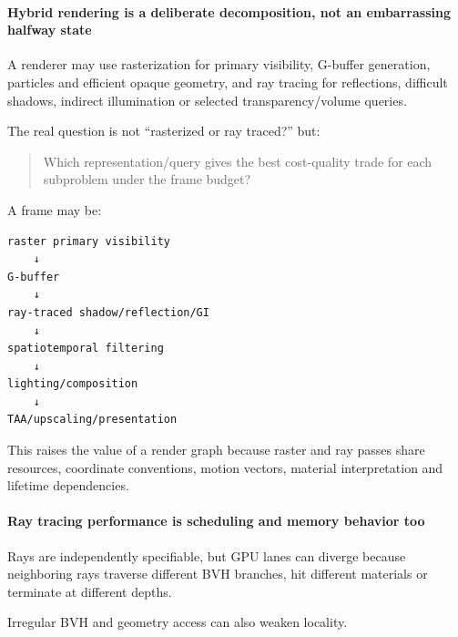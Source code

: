 \paragraph{Hybrid rendering is a deliberate decomposition, not an embarrassing halfway state}\label{03-visual-computing-i-ch001-hybrid-rendering-is-a-deliberate-decomposition-not-an-embarrassing-halfway-state}

\hypertarget{03-visual-computing-i-ch001-hybrid-rendering-is-a-deliberate-decomposition-not-an-embarrassing-halfway-state}{}

A renderer may use rasterization for primary visibility, G-buffer generation, particles and efficient opaque geometry, and ray tracing for reflections, difficult shadows, indirect illumination or selected transparency/volume queries.

The real question is not ``rasterized or ray traced?'' but:

\begin{quote}
Which representation/query gives the best cost-quality trade for each subproblem under the frame budget?
\end{quote}

A frame may be:

\begin{verbatim}
raster primary visibility
    ↓
G-buffer
    ↓
ray-traced shadow/reflection/GI
    ↓
spatiotemporal filtering
    ↓
lighting/composition
    ↓
TAA/upscaling/presentation
\end{verbatim}

This raises the value of a render graph because raster and ray passes share resources, coordinate conventions, motion vectors, material interpretation and lifetime dependencies.

\paragraph{Ray tracing performance is scheduling and memory behavior too}\label{03-visual-computing-i-ch001-ray-tracing-performance-is-scheduling-and-memory-behavior-too}

\hypertarget{03-visual-computing-i-ch001-ray-tracing-performance-is-scheduling-and-memory-behavior-too}{}

Rays are independently specifiable, but GPU lanes can diverge because neighboring rays traverse different BVH branches, hit different materials or terminate at different depths.

Irregular BVH and geometry access can also weaken locality.

